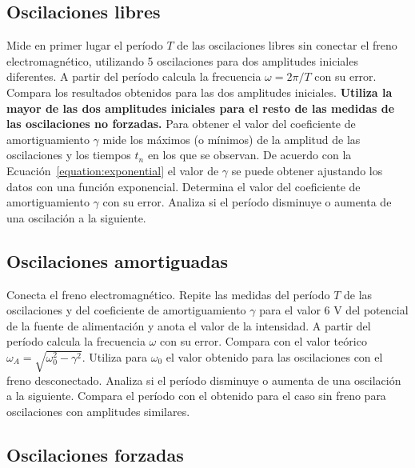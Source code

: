 \documentclass[11pt]{articulo}
\begin{document}
\subsection{Oscilaciones libres}

Mide en primer lugar el per\'iodo $T$ de las oscilaciones libres sin conectar el freno electromagn\'etico, utilizando 5 oscilaciones para dos amplitudes iniciales diferentes. A partir del per\'iodo calcula la frecuencia $\omega = 2\pi/T$ con su error. Compara los resultados obtenidos para las dos amplitudes iniciales. {\bf Utiliza la mayor de las dos amplitudes iniciales para el resto de las medidas de las oscilaciones no forzadas.} Para obtener el valor del coeficiente de amortiguamiento $\gamma$ mide los m\'aximos (o m\'inimos) de la amplitud de las oscilaciones y los tiempos $t_n$ en los que se observan. De acuerdo con la Ecuaci\'on~\ref{equation:exponential} el valor de $\gamma$ se puede obtener ajustando los datos con una funci\'on exponencial. Determina el valor del coeficiente de amortiguamiento $\gamma$ con su error. Analiza si el per\'iodo disminuye o aumenta de una oscilaci\'on a la siguiente.

\subsection{Oscilaciones amortiguadas}

Conecta el freno electromagn\'etico. Repite las medidas del per\'iodo $T$ de las oscilaciones y del coeficiente de amortiguamiento $\gamma$ para el valor 6 V del potencial de la fuente de alimentaci\'on y anota el valor de la intensidad. A partir del per\'iodo calcula la frecuencia $\omega$ con su error. Compara con el valor te\'orico $\omega_A = \sqrt{\omega_0^2 - \gamma^2}$. Utiliza para $\omega_0$ el valor obtenido para las oscilaciones con el freno desconectado. Analiza si el per\'iodo disminuye o aumenta de una oscilaci\'on a la siguiente. Compara el per\'iodo con el obtenido para el caso sin freno para oscilaciones con amplitudes similares.

\subsection{Oscilaciones forzadas}
\end{document}
